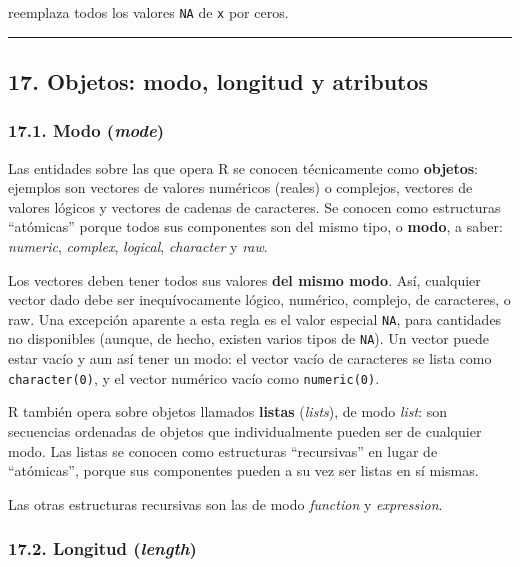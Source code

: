 \documentclass[
  jou,
  floatsintext,
  longtable,
  a4paper,
  nolmodern,
  notxfonts,
  notimes,
  12pt,
  colorlinks=true,linkcolor=blue,citecolor=blue,urlcolor=blue]{apa7}
\begin{document}
reemplaza todos los valores \texttt{NA} de \texttt{x} por ceros.

\begin{center}\rule{0.5\linewidth}{0.5pt}\end{center}

\subsection{17. Objetos: modo, longitud y
atributos}\label{objetos-modo-longitud-y-atributos}

\subsubsection{\texorpdfstring{17.1. Modo
(\emph{mode})}{17.1. Modo (mode)}}\label{modo-mode}

Las entidades sobre las que opera R se conocen técnicamente como
\textbf{objetos}: ejemplos son vectores de valores numéricos (reales) o
complejos, vectores de valores lógicos y vectores de cadenas de
caracteres. Se conocen como estructuras ``atómicas'' porque todos sus
componentes son del mismo tipo, o \textbf{modo}, a saber:
\emph{numeric}, \emph{complex}, \emph{logical}, \emph{character} y
\emph{raw}.

Los vectores deben tener todos sus valores \textbf{del mismo modo}. Así,
cualquier vector dado debe ser inequívocamente lógico, numérico,
complejo, de caracteres, o raw. Una excepción aparente a esta regla es
el valor especial \texttt{NA}, para cantidades no disponibles (aunque,
de hecho, existen varios tipos de \texttt{NA}). Un vector puede estar
vacío y aun así tener un modo: el vector vacío de caracteres se lista
como \texttt{character(0)}, y el vector numérico vacío como
\texttt{numeric(0)}.

R también opera sobre objetos llamados \textbf{listas} (\emph{lists}),
de modo \emph{list}: son secuencias ordenadas de objetos que
individualmente pueden ser de cualquier modo. Las listas se conocen como
estructuras ``recursivas'' en lugar de ``atómicas'', porque sus
componentes pueden a su vez ser listas en sí mismas.

Las otras estructuras recursivas son las de modo \emph{function} y
\emph{expression}.

\subsubsection{\texorpdfstring{17.2. Longitud
(\emph{length})}{17.2. Longitud (length)}}\label{longitud-length}
\end{document}
